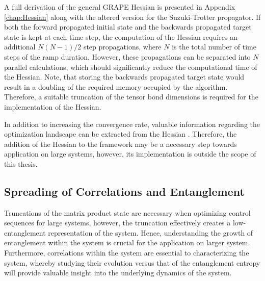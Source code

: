 A full derivation of the general GRAPE Hessian is presented in Appendix \ref{chap:Hessian} along with the altered version for the Suzuki-Trotter propagator. If both the forward propagated initial state and the backwards propagated target state is kept at each time step, the computation of the Hessian requires an additional $N(N - 1)/2$ step propagations, where $N$ is the total number of time steps of the ramp duration. However, these propagations can be separated into $N$ parallel calculations, which should significantly reduce the computational time of the Hessian. Note, that storing the backwards propagated target state would result in a doubling of the required memory occupied by the algorithm. Therefore, a suitable truncation of the tensor bond dimensions is required for the implementation of the Hessian.

In addition to increasing the convergence rate, valuable information regarding the optimization landscape can be extracted from the Hessian \cite{Shen2006}. Therefore, the addition of the Hessian to the framework may be a necessary step towards application on large systems, however, its implementation is outside the scope of this thesis.


\subsection{Spreading of Correlations and Entanglement}
Truncations of the matrix product state are necessary when optimizing control sequences for large systems, however, the truncation effectively creates a low-entanglement representation of the system. Hence, understanding the growth of entanglement within the system is crucial for the application on larger system. Furthermore, correlations within the system are essential to characterizing the system, whereby studying their evolution versus that of the entanglement entropy will provide valuable insight into the underlying dynamics of the system.


